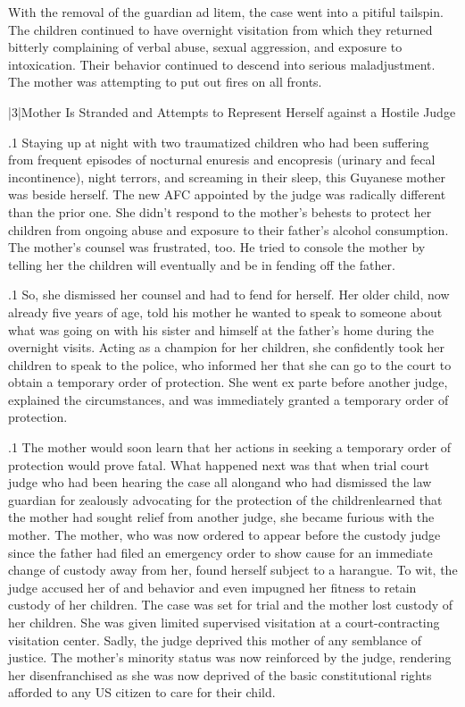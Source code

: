 \documentclass[11pt, twoside]{article}
\begin{document}
{{\nip{}%
With the removal of the guardian ad litem, the case went into a pitiful
tailspin. The children continued to have overnight visitation from which
they returned bitterly complaining of verbal abuse, sexual aggression,
and exposure to intoxication. Their behavior continued to descend into
serious maladjustment. The mother was attempting to put out fires on
all fronts.
}%


\s|3|{Mother Is Stranded and Attempts to Represent Herself against a Hostile Judge}

\p.1{%
\noindent{}Staying up at night with two traumatized children who had been suffering from frequent episodes of nocturnal enuresis and encopresis
(urinary and fecal incontinence), night terrors, and screaming in their
sleep, this Guyanese mother was beside herself. The new AFC appointed
by the judge was radically different than the prior one. She didn’t respond to the mother’s behests to protect her children from ongoing
abuse and exposure to their father’s alcohol consumption. The mother’s
counsel was frustrated, too. He tried to console the mother by telling
her the children will eventually  and be  in fending off the father.
}%

\p.1{%
So, she dismissed her counsel and had to fend for herself. Her older
child, now already five years of age, told his mother he wanted to speak
to someone about what was going on with his sister and himself at the
father’s home during the overnight visits. Acting as a champion for her
children, she confidently took her children to speak to the police, who
informed her that she can go to the court to obtain a temporary order of protection. She went ex parte before another judge, explained
the circumstances, and was immediately granted a temporary order of
protection.
}%

\p.1{%
The mother would soon learn that her actions in seeking a temporary order of protection would prove fatal. What happened next was
that when trial court judge who had been hearing the case
all along\mdash{}and who had dismissed the law guardian for zealously advocating for
the protection of the children\mdash{}learned that the mother had sought relief from another judge, she became furious with the mother. The
mother, who was now ordered to appear before the custody judge since the father had filed an emergency order to show cause for an
immediate change of custody away from her, found herself subject to
a harangue. To wit, the judge accused
her of  and  behavior
and even impugned her fitness to retain custody of her
children. The case was set for trial and the mother lost custody of
her children. She was given limited supervised visitation at a
court-contracting visitation center. Sadly, the judge deprived this mother of any
semblance of justice. The mother’s minority status was now reinforced
by the judge, rendering her disenfranchised as she was now deprived
of the basic constitutional rights afforded to any US citizen to care for
their child.
}%

}
\end{document}
